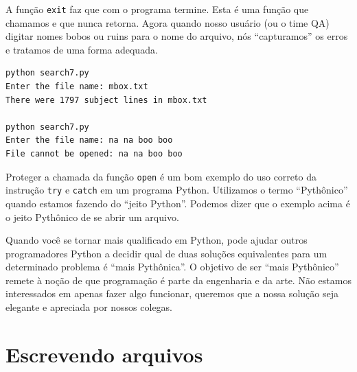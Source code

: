 A função {\tt exit} faz que com o programa termine. Esta é uma
função que chamamos e que nunca retorna. Agora quando nosso usuário
(ou o time QA) digitar nomes bobos ou ruins para o nome do arquivo,
nós ``capturamos'' os erros e tratamos de uma forma adequada.

\beforeverb
\begin{verbatim}
python search7.py
Enter the file name: mbox.txt
There were 1797 subject lines in mbox.txt

python search7.py
Enter the file name: na na boo boo
File cannot be opened: na na boo boo
\end{verbatim}
\afterverb


Proteger a chamada da função {\tt open} é um bom
exemplo do uso correto da instrução {\tt try} e 
{\tt catch} em um programa Python. Utilizamos o termo
``Pythônico'' quando estamos fazendo do ``jeito Python''.
Podemos dizer que o exemplo acima é o jeito Pythônico
de se abrir um arquivo.

Quando você se tornar mais qualificado em Python, pode
ajudar outros programadores Python a decidir qual de duas
soluções equivalentes para um determinado problema é
``mais Pythônica''. O objetivo de ser ``mais Pythônico''
remete à noção de que programação é parte da engenharia
e da arte. Não estamos interessados em apenas fazer algo
funcionar, queremos que a nossa solução seja elegante
e apreciada por nossos colegas.

\section{Escrevendo arquivos}

